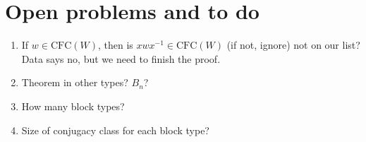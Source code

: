 \documentclass{article}
\newcommand{\CFC}{\text{CFC}(W)}
\theoremstyle{definition}
\theoremstyle{theorem}
\begin{document}
\section{Open problems and to do} \begin{enumerate}
\item If $w \in \CFC$, then is $xwx^{-1} \in \CFC$ (if not, ignore) not on our list? Data says no, but we need to finish the proof.
\item Theorem in other types? $B_n$?
\item How many block types?
\item Size of conjugacy class for each block type?
\end{enumerate}
\end{document}
